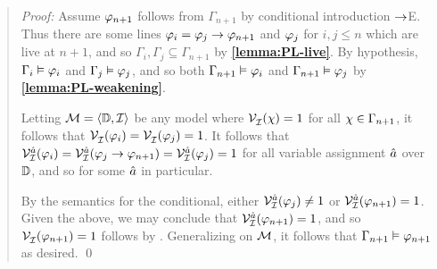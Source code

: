\begin{quote} 
  \textit{Proof:} Assume $\varphi_{n+1}$ follows from $\Gamma_{n+1}$ by conditional introduction $\rightarrow$E.
  Thus there are some lines $\varphi_i=\varphi_j\rightarrow\varphi_{n+1}$ and $\varphi_j$ for $i,j\leq n$ which are live at $n+1$, and so $\Gamma_i,\Gamma_j\subseteq\Gamma_{n+1}$ by \textbf{\ref{lemma:PL-live}}.
  By hypothesis, $\Gamma_i\vDash \varphi_i$ and $\Gamma_j\vDash \varphi_j$, and so both $\Gamma_{n+1} \vDash \varphi_i$ and $\Gamma_{n+1} \vDash \varphi_j$ by \textbf{\ref{lemma:PL-weakening}}.

  Letting $\mathcal{M}=\langle\mathbb{D},\mathcal{I}\rangle$ be any model where $\mathcal{V}_{\mathcal{I}}^{}(\chi) = 1$ for all $\chi \in \Gamma_{n+1}$, it follows that $\mathcal{V}_{\mathcal{I}}^{}(\varphi_i) = \mathcal{V}_{\mathcal{I}}^{}(\varphi_j) = 1$.
  It follows that $\mathcal{V}_{\mathcal{I}}^{\hat{a}}(\varphi_i)=\mathcal{V}_{\mathcal{I}}^{\hat{a}}(\varphi_j\rightarrow\varphi_{n+1})=\mathcal{V}_{\mathcal{I}}^{\hat{a}}(\varphi_j)=1$ for all variable assignment $\hat{a}$ over $\mathbb{D}$, and so for some $\hat{a}$ in particular.

  By the semantics for the conditional, either $\mathcal{V}_{\mathcal{I}}^{\hat{a}}(\varphi_j)\neq 1$ or $\mathcal{V}_{\mathcal{I}}^{\hat{a}}(\varphi_{n+1})=1$.
  Given the above, we may conclude that $\mathcal{V}_{\mathcal{I}}^{\hat{a}}(\varphi_{n+1})=1$, and so $\mathcal{V}_{\mathcal{I}}^{}(\varphi_{n+1})=1$ follows by  .
  Generalizing on $\mathcal{M}$, it follows that $\Gamma_{n+1} \vDash \varphi_{n+1}$ as desired.
  \qed
\end{quote}






